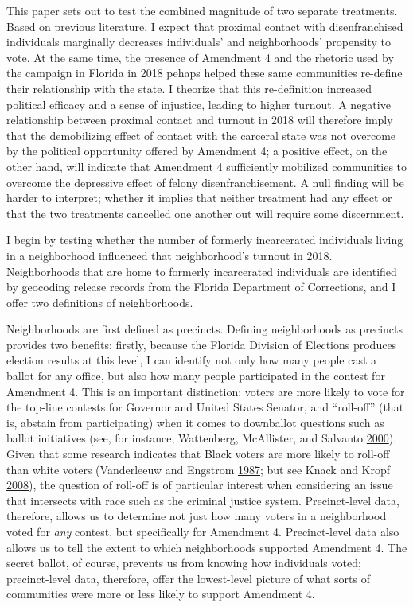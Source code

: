 \documentclass[
  12pt,
]{article}
\begin{document}
This paper sets out to test the combined magnitude of two separate treatments. Based on previous literature, I expect that proximal contact with disenfranchised individuals marginally decreases individuals' and neighborhoods' propensity to vote. At the same time, the presence of Amendment 4 and the rhetoric used by the campaign in Florida in 2018 pehaps helped these same communities re-define their relationship with the state. I theorize that this re-definition increased political efficacy and a sense of injustice, leading to higher turnout. A negative relationship between proximal contact and turnout in 2018 will therefore imply that the demobilizing effect of contact with the carceral state was not overcome by the political opportunity offered by Amendment 4; a positive effect, on the other hand, will indicate that Amendment 4 sufficiently mobilized communities to overcome the depressive effect of felony disenfranchisement. A null finding will be harder to interpret; whether it implies that neither treatment had any effect or that the two treatments cancelled one another out will require some discernment.

I begin by testing whether the number of formerly incarcerated individuals living in a neighborhood influenced that neighborhood's turnout in 2018. Neighborhoods that are home to formerly incarcerated individuals are identified by geocoding release records from the Florida Department of Corrections, and I offer two definitions of neighborhoods.

Neighborhoods are first defined as precincts. Defining neighborhoods as precincts provides two benefits: firstly, because the Florida Division of Elections produces election results at this level, I can identify not only how many people cast a ballot for any office, but also how many people participated in the contest for Amendment 4. This is an important distinction: voters are more likely to vote for the top-line contests for Governor and United States Senator, and ``roll-off'' (that is, abstain from participating) when it comes to downballot questions such as ballot initiatives (see, for instance, Wattenberg, McAllister, and Salvanto \protect\hyperlink{ref-Wattenberg2000}{2000}). Given that some research indicates that Black voters are more likely to roll-off than white voters (Vanderleeuw and Engstrom \protect\hyperlink{ref-Vanderleeuw1987}{1987}; but see Knack and Kropf \protect\hyperlink{ref-Knack2008}{2008}), the question of roll-off is of particular interest when considering an issue that intersects with race such as the criminal justice system. Precinct-level data, therefore, allows us to determine not just how many voters in a neighborhood voted for \emph{any} contest, but specifically for Amendment 4. Precinct-level data also allows us to tell the extent to which neighborhoods supported Amendment 4. The secret ballot, of course, prevents us from knowing how individuals voted; precinct-level data, therefore, offer the lowest-level picture of what sorts of communities were more or less likely to support Amendment 4.
\end{document}
